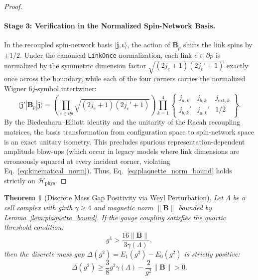 \documentclass[11pt,reqno]{article}
\newtheorem{theorem}{Theorem}[section]
\begin{document}
\begin{proof}
\paragraph{Stage 3: Verification in the Normalized Spin-Network Basis.}
In the recoupled spin-network basis $|\mathbf{j}, \bm{\iota}\rangle$, the action of $\mathbf{B}_p$ shifts the link spins by $\pm 1/2$.
Under the canonical \texttt{LinkOnce} normalization, each link $e \in \partial p$ is normalized by the symmetric dimension factor $\sqrt{(2j_e+1)(2j_e'+1)}$ exactly once across the boundary, while each of the four corners carries the normalized Wigner $6j$-symbol intertwiner:
\begin{equation}
    \label{eq:matrix_element_recoupling}
    \langle \mathbf{j}' | \mathbf{B}_p | \mathbf{j} \rangle = \left( \prod_{e \in \partial p} \sqrt{(2j_e+1)(2j_e'+1)} \right) \prod_{k=1}^4 \begin{Bmatrix} j_{a,k} & j_{b,k} & j_{\mathrm{ext},k} \\ j_{b,k}' & j_{a,k}' & 1/2 \end{Bmatrix}.
\end{equation}
By the Biedenharn--Elliott identity and the unitarity of the Racah recoupling matrices, the basis transformation from configuration space to spin-network space is an exact unitary isometry.
This precludes spurious representation-dependent amplitude blow-ups (which occur in legacy models where link dimensions are erroneously squared at every incident corner, violating Eq.~\eqref{eq:kinematical_norm}).
Thus, Eq.~\eqref{eq:plaquette_norm_bound} holds strictly on $\mathcal{H}_{\mathrm{phys}}$.
\end{proof}

\begin{theorem}[Discrete Mass Gap Positivity via Weyl Perturbation]
\label{thm:discrete_gap_positivity}
Let $\Lambda$ be a cell complex with girth $\gamma \ge 4$ and magnetic norm $\|\mathbf{B}\|$ bounded by Lemma~\ref{lem:plaquette_bound}.
If the gauge coupling satisfies the quartic threshold condition:
\begin{equation}
    \label{eq:quartic_threshold_def}
    g^4 > \frac{16 \|\mathbf{B}\|}{3 \gamma(\Lambda)},
\end{equation}
then the discrete mass gap $\Delta(g^2) = E_1(g^2) - E_0(g^2)$ is strictly positive:
\begin{equation}
    \label{eq:discrete_gap_formula}
    \Delta(g^2) \ge \frac{3}{8} g^2 \gamma(\Lambda) - \frac{2}{g^2}\|\mathbf{B}\| > 0.
\end{equation}
\end{theorem}
\end{document}
